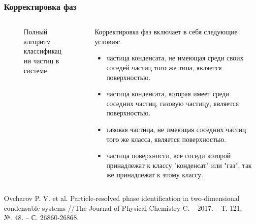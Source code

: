 \documentclass[pdf,hyperref={unicode}]{beamer}
\begin{document}
\begin{frame}
\transdissolve[duration=0.2]
\frametitle{Корректировка фаз}
\begin{columns}

\begin{column}{0.47\linewidth}
{
\begin{figure}[h]
\caption{\tiny Полный алгоритм классификации частиц в системе.}
\end{figure}
}
\end{column}

\begin{column}{0.47\linewidth}
{\tiny{
Корректировка фаз включает в себя следующие условия:
\begin{itemize}
\item частица конденсата, не имеющая среди своих соседей частиц того же типа, является поверхностью.
\item частица конденсата, которая имеет среди соседних частиц, газовую частицу, является поверхностью.
\item газовая частица, не имеющая соседних частиц того же класса,  является поверхностью.
\item частица поверхности, все соседи которой принадлежат к классу "конденсат" или "газ", так же принадлежат к этому классу.
\end{itemize}
}}
\end{column}

\end{columns}

\vspace{12mm}
\tiny{
Ovcharov P. V. et al. Particle-resolved phase identification in two-dimensional condensable systems //The Journal of Physical Chemistry C. – 2017. – Т. 121. – №. 48. – С. 26860-26868.
}
\end{frame}
\end{document}
